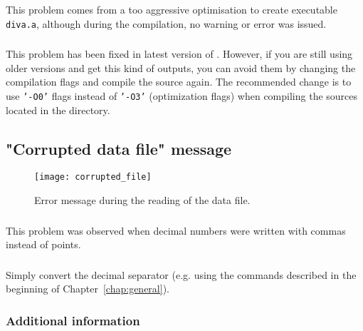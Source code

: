 \subsubsection{\question}

This problem comes from a too aggressive optimisation to create executable \texttt{diva.a}, although during the compilation, no warning or error was issued.  

\subsubsection{\answer}

This problem has been fixed in latest version of \diva. However, if you are still using older versions and get this kind of outputs, you can avoid them by changing the compilation flags and compile the source again. The recommended change is to use \texttt{'-O0'} flags instead of \texttt{'-O3'} (optimization flags) when compiling the sources located in the  directory.


\subsection{"Corrupted data file" message}


\begin{figure}[htpb]
\centering
\texttt{[image: corrupted\_file]}
\caption{Error message during the reading of the data file.}
\end{figure}

\subsubsection{\question}


This problem was observed when decimal numbers were written with commas instead of points.


\subsubsection{\answer}

Simply convert the decimal separator (e.g. using the commands described in the beginning of Chapter~\ref{chap:general}).


\subsubsection{Additional information}

